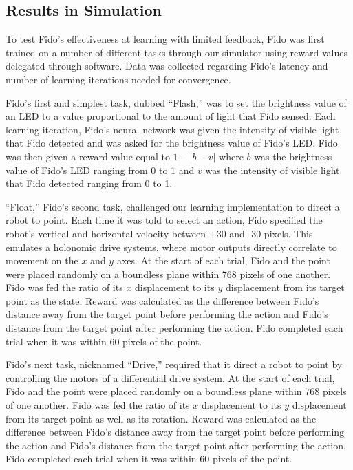 \subsection{Results in Simulation}

To test Fido's effectiveness at learning with limited feedback, Fido was first trained on a number of different tasks through our simulator using reward values delegated through software.
Data was collected regarding Fido's latency and number of learning iterations needed for convergence.

Fido's first and simplest task, dubbed ``Flash,'' was to set the brightness value of an LED to a value proportional to the amount of light that Fido sensed.
Each learning iteration, Fido's neural network was given the intensity of visible light that Fido detected and was asked for the brightness value of Fido's LED.
Fido was then given a reward value equal to $1 - |b - v|$ where $b$ was the brightness value of Fido's LED ranging from 0 to 1 and $v$ was the intensity of visible light that Fido detected ranging from 0 to 1.

``Float,'' Fido's second task, challenged our learning implementation to direct a robot to point.
Each time it was told to select an action, Fido specified the robot's vertical and horizontal velocity between +30 and -30 pixels.
This emulates a holonomic drive systems, where motor outputs directly correlate to movement on the $x$ and $y$ axes.
At the start of each trial, Fido and the point were placed randomly on a boundless plane within 768 pixels of one another.
Fido was fed the ratio of its $x$ displacement to its $y$ displacement from its target point as the state.
Reward was calculated as the difference between Fido's distance away from the target point before performing the action and Fido's distance from the target point after performing the action.
Fido completed each trial when it was within 60 pixels of the point.

Fido's next task, nicknamed ``Drive,'' required that it direct a robot to point by controlling the motors of a differential drive system.
At the start of each trial, Fido and the point were placed randomly on a boundless plane within 768 pixels of one another.
Fido was fed the ratio of its $x$ displacement to its $y$ displacement from its target point as well as its rotation.
Reward was calculated as the difference between Fido's distance away from the target point before performing the action and Fido's distance from the target point after performing the action.
Fido completed each trial when it was within 60 pixels of the point.

